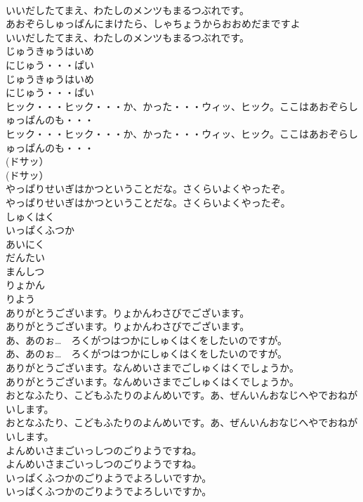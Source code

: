 \documentclass[8pt]{extreport}
\begin{document}
\begin{CJK}{UTF8}{min}
\\	いいだしたてまえ、わたしのメンツもまるつぶれです。
\\	あおぞらしゅっぱんにまけたら、しゃちょうからおおめだまですよ
\\	いいだしたてまえ、わたしのメンツもまるつぶれです。
\\	じゅうきゅうはいめ
\\	にじゅう・・・ぱい
\\	じゅうきゅうはいめ
\\	にじゅう・・・ぱい
\\	ヒック・・・ヒック・・・か、かった・・・ウィッ、ヒック。ここはあおぞらしゅっぱんのも・・・
\\	ヒック・・・ヒック・・・か、かった・・・ウィッ、ヒック。ここはあおぞらしゅっぱんのも・・・
\\	(ドサッ）
\\	(ドサッ）
\\	やっぱりせいぎはかつということだな。さくらいよくやったぞ。
\\	やっぱりせいぎはかつということだな。さくらいよくやったぞ。
\\	しゅくはく
\\	いっぱくふつか
\\	あいにく
\\	だんたい
\\	まんしつ
\\	りょかん
\\	りよう
\\	ありがとうございます。りょかんわさびでございます。
\\	ありがとうございます。りょかんわさびでございます。
\\	あ、あのぉ…　ろくがつはつかにしゅくはくをしたいのですが。
\\	あ、あのぉ…　ろくがつはつかにしゅくはくをしたいのですが。
\\	ありがとうございます。なんめいさまでごしゅくはくでしょうか。
\\	ありがとうございます。なんめいさまでごしゅくはくでしょうか。
\\	おとなふたり、こどもふたりのよんめいです。あ、ぜんいんおなじへやでおねがいします。
\\	おとなふたり、こどもふたりのよんめいです。あ、ぜんいんおなじへやでおねがいします。
\\	よんめいさまごいっしつのごりようですね。
\\	よんめいさまごいっしつのごりようですね。
\\	いっぱくふつかのごりようでよろしいですか。
\\	いっぱくふつかのごりようでよろしいですか。

\end{CJK}
\end{document}
